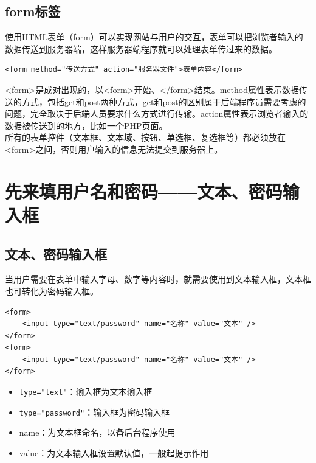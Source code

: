 \subsection{form标签}

使用HTML表单（form）可以实现网站与用户的交互，表单可以把浏览者输入的数据传送到服务器端，这样服务器端程序就可以处理表单传过来的数据。\\

\begin{lstlisting}[style=htmlcssjs]
<form method="传送方式" action="服务器文件">表单内容</form>
\end{lstlisting}

<form>是成对出现的，以<form>开始、</form>结束。method属性表示数据传送的方式，包括get和post两种方式，get和post的区别属于后端程序员需要考虑的问题，完全取决于后端人员要求什么方式进行传输。action属性表示浏览者输入的数据被传送到的地方，比如一个PHP页面。\\

所有的表单控件（文本框、文本域、按钮、单选框、复选框等）都必须放在<form>之间，否则用户输入的信息无法提交到服务器上。

\newpage

\section{先来填用户名和密码——文本、密码输入框}

\subsection{文本、密码输入框}

当用户需要在表单中输入字母、数字等内容时，就需要使用到文本输入框，文本框也可转化为密码输入框。\\

\begin{lstlisting}[style=htmlcssjs]
<form>
    <input type="text/password" name="名称" value="文本" />
</form>
<form>
    <input type="text/password" name="名称" value="文本" />
</form>
\end{lstlisting}

\begin{itemize}
	\item \lstinline|type="text"|：输入框为文本输入框
	\item \lstinline|type="password"|：输入框为密码输入框
	\item name：为文本框命名，以备后台程序使用
	\item value：为文本输入框设置默认值，一般起提示作用
\end{itemize}

